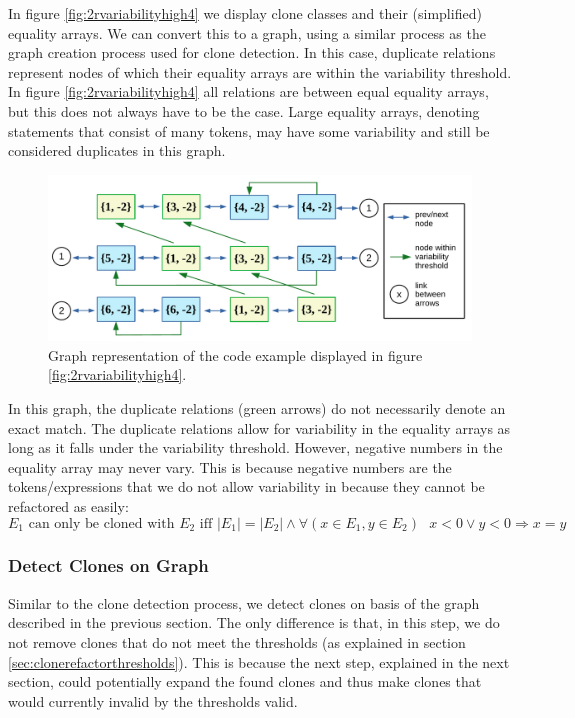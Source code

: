 In figure \ref{fig:2rvariabilityhigh4} we display clone classes and their (simplified) equality arrays. We can convert this to a graph, using a similar process as the graph creation process used for clone detection. In this case, duplicate relations represent nodes of which their equality arrays are within the variability threshold. In figure \ref{fig:2rvariabilityhigh4} all relations are between equal equality arrays, but this does not always have to be the case. Large equality arrays, denoting statements that consist of many tokens, may have some variability and still be considered duplicates in this graph.

\begin{figure}[H]
  \centering
  \includegraphics[width=1\columnwidth]{img/T2RGraph}
  \caption{Graph representation of the code example displayed in figure \ref{fig:2rvariabilityhigh4}.}
  \label{fig:clonerefactorprocess}
\end{figure}

In this graph, the duplicate relations (green arrows) do not necessarily denote an exact match. The duplicate relations allow for variability in the equality arrays as long as it falls under the variability threshold. However, negative numbers in the equality array may never vary. This is because negative numbers are the tokens/expressions that we do not allow variability in because they cannot be refactored as easily:
\begin{equation}\label{eq:t2rcloneequality}
E_1\text{ can only be cloned with }E_2\text{ iff }|E_1|=|E_2| \land \forall (x \in E_1, y \in E_2)\text{ }x<0 \lor y<0 \Rightarrow x=y
\end{equation}

\subsubsection{Detect Clones on Graph}
Similar to the clone detection process, we detect clones on basis of the graph described in the previous section. The only difference is that, in this step, we do not remove clones that do not meet the thresholds (as explained in section \ref{sec:clonerefactorthresholds}). This is because the next step, explained in the next section, could potentially expand the found clones and thus make clones that would currently invalid by the thresholds valid.

